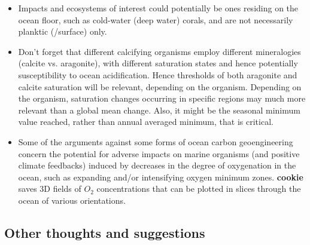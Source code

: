 \begin{itemize}

\vspace{1mm}
\item Impacts and ecosystems of interest could potentially be ones residing on the ocean floor, such as cold-water (deep water) corals, and are not necessarily planktic (/surface) only.

\vspace{1mm}
\item Don’t forget that different calcifying organisms employ different mineralogies (calcite vs. aragonite), with different saturation states and hence potentially susceptibility to ocean acidification. Hence thresholds of both aragonite and calcite saturation will be relevant, depending on the organism. Depending on the organism, saturation changes occurring in specific regions may much more relevant than a global mean change. Also, it might be the seasonal minimum value reached, rather than annual averaged minimum, that is critical.

\vspace{1mm}
\item Some of the arguments against some forms of ocean carbon geoengineering concern the potential for adverse impacts on marine organisms (and positive climate feedbacks) induced by decreases in the degree of oxygenation in the ocean, such as expanding and/or intensifying oxygen minimum zones. \textbf{cookie} saves 3D fields of \(O_{2}\) concentrations that can be plotted in slices through the ocean of various orientations.

\end{itemize}


\subsection{Other thoughts and suggestions}

